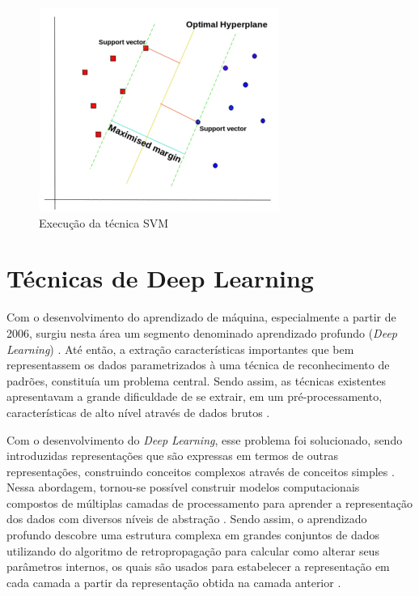 \begin{figure}[h]
  \centering
  \caption{Execução da técnica SVM}
   \label{fig:execucao_svm}
   \includegraphics[width=0.7\textwidth]{figuras/fig_7.png}
\end{figure}

\section{Técnicas de Deep Learning}

Com o desenvolvimento do aprendizado de máquina, especialmente a partir de 2006, surgiu nesta área um segmento denominado aprendizado profundo (\textit{Deep Learning}) \cite{Deng2014}. Até então, a extração características importantes que bem representassem os dados parametrizados à uma técnica de reconhecimento de padrões, constituía um problema central. Sendo assim, as técnicas existentes apresentavam a grande dificuldade de se extrair, em um pré-processamento, características de alto nível através de dados brutos \cite{Goodfellow2016}. 

Com o desenvolvimento do \textit{Deep Learning}, esse problema foi solucionado, sendo introduzidas representações que são expressas em termos de outras representações, construindo conceitos complexos através de conceitos simples \cite{Goodfellow2016}. Nessa abordagem, tornou-se possível construir modelos computacionais compostos de múltiplas camadas de processamento para aprender a representação dos dados com diversos níveis de abstração \cite{LeCun2015}. Sendo assim, o aprendizado profundo descobre uma estrutura complexa em grandes conjuntos de dados utilizando do algoritmo de retropropagação para calcular como alterar seus parâmetros internos, os quais são usados para estabelecer a representação em cada camada a partir da representação obtida na camada anterior \cite{LeCun2015}.

